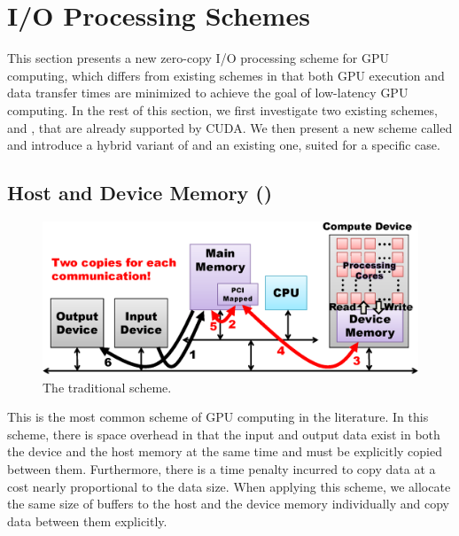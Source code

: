 \section{I/O Processing Schemes}
\label{sec:io_processing}

This section presents a new zero-copy I/O processing scheme for GPU
computing, which differs from existing schemes in that both GPU
execution and data transfer times are minimized to achieve the goal of
low-latency GPU computing. 
In the rest of this section, we first investigate two existing schemes,
{\hd} and {\hp}, that are already supported by CUDA.
We then present a new scheme called {\dm} and introduce a hybrid
variant of {\dm} and an existing one, suited for a specific case. 

\subsection{Host and Device Memory ({\hd})}
\label{sec:hd}

\begin{figure}[!t]
 \centering
 \includegraphics[width=\hsize]{eps/hd2.eps}
 \caption{The traditional {\hd} scheme.}
 \label{fig:hd}
\end{figure}

This is the most common scheme of GPU computing in the literature.
In this scheme, there is space overhead in that the input and output
data exist in both the device and the host memory at the same time and
must be explicitly copied between them.
Furthermore, there is a time penalty incurred to copy data at a cost
nearly proportional to the data size.
When applying this scheme, we allocate the same size of buffers to the
host and the device memory individually and copy data between them
explicitly.

